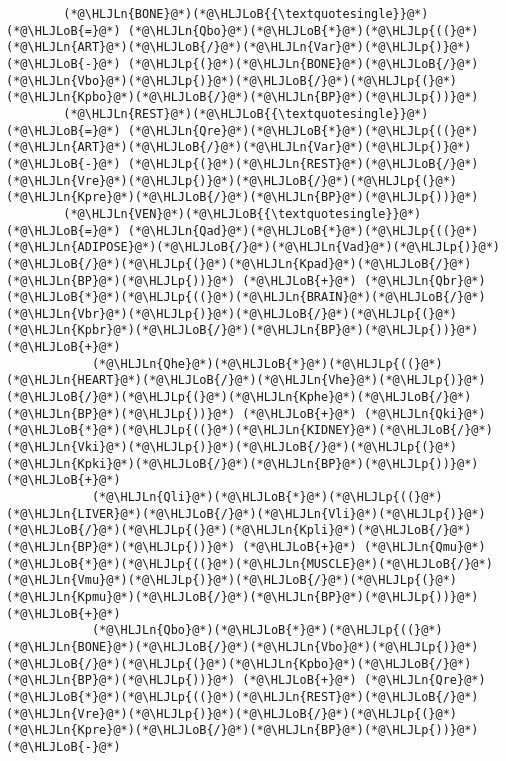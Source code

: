 \documentclass[12pt,a4paper]{article}
\newcommand{\HLJLn}[1]{#1}
\newcommand{\HLJLoB}[1]{\textcolor[RGB]{102,102,102}{\textbf{#1}}}
\newcommand{\HLJLp}[1]{#1}
\begin{document}
\begin{lstlisting}
        (*@\HLJLn{BONE}@*)(*@\HLJLoB{{\textquotesingle}}@*) (*@\HLJLoB{=}@*) (*@\HLJLn{Qbo}@*)(*@\HLJLoB{*}@*)(*@\HLJLp{((}@*)(*@\HLJLn{ART}@*)(*@\HLJLoB{/}@*)(*@\HLJLn{Var}@*)(*@\HLJLp{)}@*) (*@\HLJLoB{-}@*) (*@\HLJLp{(}@*)(*@\HLJLn{BONE}@*)(*@\HLJLoB{/}@*)(*@\HLJLn{Vbo}@*)(*@\HLJLp{)}@*)(*@\HLJLoB{/}@*)(*@\HLJLp{(}@*)(*@\HLJLn{Kpbo}@*)(*@\HLJLoB{/}@*)(*@\HLJLn{BP}@*)(*@\HLJLp{))}@*)
        (*@\HLJLn{REST}@*)(*@\HLJLoB{{\textquotesingle}}@*) (*@\HLJLoB{=}@*) (*@\HLJLn{Qre}@*)(*@\HLJLoB{*}@*)(*@\HLJLp{((}@*)(*@\HLJLn{ART}@*)(*@\HLJLoB{/}@*)(*@\HLJLn{Var}@*)(*@\HLJLp{)}@*) (*@\HLJLoB{-}@*) (*@\HLJLp{(}@*)(*@\HLJLn{REST}@*)(*@\HLJLoB{/}@*)(*@\HLJLn{Vre}@*)(*@\HLJLp{)}@*)(*@\HLJLoB{/}@*)(*@\HLJLp{(}@*)(*@\HLJLn{Kpre}@*)(*@\HLJLoB{/}@*)(*@\HLJLn{BP}@*)(*@\HLJLp{))}@*)
        (*@\HLJLn{VEN}@*)(*@\HLJLoB{{\textquotesingle}}@*) (*@\HLJLoB{=}@*) (*@\HLJLn{Qad}@*)(*@\HLJLoB{*}@*)(*@\HLJLp{((}@*)(*@\HLJLn{ADIPOSE}@*)(*@\HLJLoB{/}@*)(*@\HLJLn{Vad}@*)(*@\HLJLp{)}@*)(*@\HLJLoB{/}@*)(*@\HLJLp{(}@*)(*@\HLJLn{Kpad}@*)(*@\HLJLoB{/}@*)(*@\HLJLn{BP}@*)(*@\HLJLp{))}@*) (*@\HLJLoB{+}@*) (*@\HLJLn{Qbr}@*)(*@\HLJLoB{*}@*)(*@\HLJLp{((}@*)(*@\HLJLn{BRAIN}@*)(*@\HLJLoB{/}@*)(*@\HLJLn{Vbr}@*)(*@\HLJLp{)}@*)(*@\HLJLoB{/}@*)(*@\HLJLp{(}@*)(*@\HLJLn{Kpbr}@*)(*@\HLJLoB{/}@*)(*@\HLJLn{BP}@*)(*@\HLJLp{))}@*) (*@\HLJLoB{+}@*)
            (*@\HLJLn{Qhe}@*)(*@\HLJLoB{*}@*)(*@\HLJLp{((}@*)(*@\HLJLn{HEART}@*)(*@\HLJLoB{/}@*)(*@\HLJLn{Vhe}@*)(*@\HLJLp{)}@*)(*@\HLJLoB{/}@*)(*@\HLJLp{(}@*)(*@\HLJLn{Kphe}@*)(*@\HLJLoB{/}@*)(*@\HLJLn{BP}@*)(*@\HLJLp{))}@*) (*@\HLJLoB{+}@*) (*@\HLJLn{Qki}@*)(*@\HLJLoB{*}@*)(*@\HLJLp{((}@*)(*@\HLJLn{KIDNEY}@*)(*@\HLJLoB{/}@*)(*@\HLJLn{Vki}@*)(*@\HLJLp{)}@*)(*@\HLJLoB{/}@*)(*@\HLJLp{(}@*)(*@\HLJLn{Kpki}@*)(*@\HLJLoB{/}@*)(*@\HLJLn{BP}@*)(*@\HLJLp{))}@*) (*@\HLJLoB{+}@*)
            (*@\HLJLn{Qli}@*)(*@\HLJLoB{*}@*)(*@\HLJLp{((}@*)(*@\HLJLn{LIVER}@*)(*@\HLJLoB{/}@*)(*@\HLJLn{Vli}@*)(*@\HLJLp{)}@*)(*@\HLJLoB{/}@*)(*@\HLJLp{(}@*)(*@\HLJLn{Kpli}@*)(*@\HLJLoB{/}@*)(*@\HLJLn{BP}@*)(*@\HLJLp{))}@*) (*@\HLJLoB{+}@*) (*@\HLJLn{Qmu}@*)(*@\HLJLoB{*}@*)(*@\HLJLp{((}@*)(*@\HLJLn{MUSCLE}@*)(*@\HLJLoB{/}@*)(*@\HLJLn{Vmu}@*)(*@\HLJLp{)}@*)(*@\HLJLoB{/}@*)(*@\HLJLp{(}@*)(*@\HLJLn{Kpmu}@*)(*@\HLJLoB{/}@*)(*@\HLJLn{BP}@*)(*@\HLJLp{))}@*) (*@\HLJLoB{+}@*)
            (*@\HLJLn{Qbo}@*)(*@\HLJLoB{*}@*)(*@\HLJLp{((}@*)(*@\HLJLn{BONE}@*)(*@\HLJLoB{/}@*)(*@\HLJLn{Vbo}@*)(*@\HLJLp{)}@*)(*@\HLJLoB{/}@*)(*@\HLJLp{(}@*)(*@\HLJLn{Kpbo}@*)(*@\HLJLoB{/}@*)(*@\HLJLn{BP}@*)(*@\HLJLp{))}@*) (*@\HLJLoB{+}@*) (*@\HLJLn{Qre}@*)(*@\HLJLoB{*}@*)(*@\HLJLp{((}@*)(*@\HLJLn{REST}@*)(*@\HLJLoB{/}@*)(*@\HLJLn{Vre}@*)(*@\HLJLp{)}@*)(*@\HLJLoB{/}@*)(*@\HLJLp{(}@*)(*@\HLJLn{Kpre}@*)(*@\HLJLoB{/}@*)(*@\HLJLn{BP}@*)(*@\HLJLp{))}@*) (*@\HLJLoB{-}@*)

\end{lstlisting}
\end{document}
